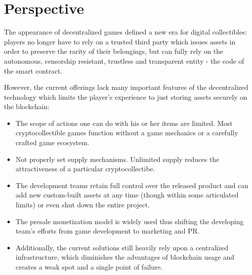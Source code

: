 \documentclass[12pt]{article}
\begin{document}
\newpage
\par


\vspace{\baselineskip}



\tableofcontents

\vspace{\baselineskip}



\newpage

\vspace{\baselineskip}\section{Perspective}
The appearance of decentralized games defined a new era for digital collectibles: players no longer have to rely on a trusted third party which issues assets in order to preserve the rarity of their belongings, but can fully rely on the autonomous, censorship resistant, trustless and transparent entity - the code of the smart contract.\par

However, the current offerings lack many important features of the decentralized technology which limits the player’s experience to just storing assets securely on the blockchain:\par

\begin{itemize}
	\item The scope of actions one can do with his or her items are limited. Most cryptocollectible games function without a game mechanics or a carefully crafted game ecosystem.\par

	\item Not properly set supply mechanisms. Unlimited supply reduces the attractiveness of a particular cryptocollectibe.\par

	\item The development teams retain full control over the released product and can add new custom-built assets at any time (though within some articulated limits) or even shut down the entire project.\par

	\item The presale monetization model is widely used thus shifting the developing team’s efforts from game development to marketing and PR.\par

	\item Additionally, the current solutions still heavily rely upon a centralized infrastructure, which diminishes the advantages of blockchain usage and creates a weak spot and a single point of failure.
\end{itemize}\par
\end{document}
